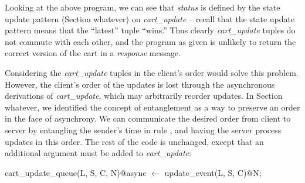 Looking at the above program, we can see that {\em status} is defined by the
state update pattern (Section whatever) on {\em cart\_update} -- recall that
the state update pattern means that the ``latest'' tuple ``wins.'' Thus clearly
{\em cart\_update} tuples do not commute with each other, and the program as
given is unlikely to return the correct version of the cart in a {\em response}
message.

Considering the {\em cart\_update} tuples in the client's order would solve
this problem.  However, the client's order of the updates is lost through the
asynchronous derivations of {\em cart\_update}, which may arbitrarily reorder
updates.  In Section whatever, we identified the concept of entanglement as a
way to preserve an order in the face of asynchrony.  We can communicate the
desired order from client to server by entangling the sender's time in rule
, and having the server process updates in this order.
The rest of the code is unchanged, except that an additional argument must be
added to {\em cart\_update}:

\begin{Dedalus}
cart_update_queue(L, S, C, N)@async \(\leftarrow\)
    update_event(L, S, C)@N;
\end{Dedalus}

